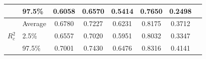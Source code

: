 \begin{table}[H]
\begin{tabular}{@{}llcccccc@{}}
                                           & 97.5\%  & 0.6058 & 0.6570 & 0.5414 & 0.7650 & 0.2498 \\ \midrule
      \multirow{3}{*}{$R^2_c$}            & Average & 0.6780 & 0.7227 & 0.6231 & 0.8175 & 0.3712 \\
                                           & 2.5\%   & 0.6557 & 0.7020 & 0.5951 & 0.8032 & 0.3347 \\
                                           & 97.5\%  & 0.7001 & 0.7430 & 0.6476 & 0.8316 & 0.4141 \\ \bottomrule
    \end{tabular}

\end{table}
